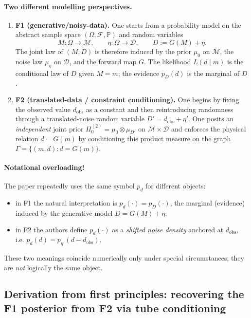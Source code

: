 \documentclass[11pt]{article}
\theoremstyle{remark}
\newcommand{\modelspace}{\mathcal{M}}
\newcommand{\dataspace}{\mathcal{D}}
\begin{document}
\paragraph{Two different modelling perspectives.}
\begin{enumerate}
  \item \textbf{F1 (generative/noisy-data).} One starts from a probability model
    on the abstract sample space \((\Omega,\mathcal{F},\mathbb{P})\) and random
    variables
    \[
    M:\Omega\to\modelspace,\qquad \eta:\Omega\to\dataspace,
    \qquad D := G(M)+\eta.
    \]
    The joint law of \((M,D)\) is therefore induced by the prior \(\mu_0\) on
    \(\modelspace\), the noise law \(\mu_\eta\) on \(\dataspace\), and the
    forward map \(G\). The likelihood \(L(d\mid m)\) is the conditional law
    of \(D\) given \(M=m\); the evidence \(p_D(d)\) is the marginal of \(D\).
  \item \textbf{F2 (translated-data / constraint conditioning).} One begins by
    fixing the observed value \(d_{\mathrm{obs}}\) as a constant and then
    reintroducing randomness through a translated-noise random variable
    \(D' = d_{\mathrm{obs}} + \eta'\). One posits an \emph{independent} joint
    prior \(\Pi_0^{(2)}=\mu_0\otimes\mu_{D'}\) on \(\modelspace\times\dataspace\)
    and enforces the physical relation \(d=G(m)\) by conditioning this product
    measure on the graph \(\Gamma=\{(m,d):d=G(m)\}\).
\end{enumerate}

\paragraph{Notational overloading!}
The paper repeatedly uses the same symbol \(p_d\) for different objects:
\begin{itemize}
  \item in F1 the natural interpretation is \(p_d(\cdot)=p_D(\cdot)\), the
    marginal (evidence) induced by the generative model \(D=G(M)+\eta\);
  \item in F2 the authors define \(p_d(\cdot)\) as a \emph{shifted noise
    density} anchored at \(d_{\mathrm{obs}}\), i.e. \(p_d(d)=p_{\eta'}(d-d_{\mathrm{obs}})\).
\end{itemize}
These two meanings coincide numerically only under special circumstances; they
are \emph{not} logically the same object. 


\subsection{Derivation from first principles: recovering the F1 posterior from F2 via tube conditioning}
\end{document}

